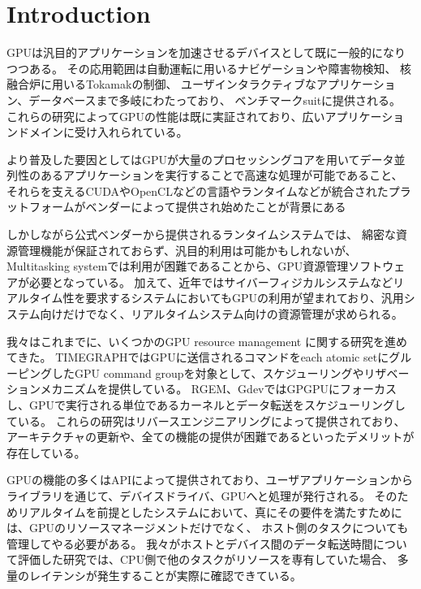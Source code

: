 \section{Introduction}
GPUは汎目的アプリケーションを加速させるデバイスとして既に一般的になりつつある。
その応用範囲は自動運転に用いるナビゲーション\cite{cmu:routing}や障害物検知\cite{hirabayashi:cpsna2013}、
核融合炉に用いるTokamakの制御\cite{tokamak}、
ユーザインタラクティブなアプリケーション\cite{kato:rtas2011}、データベース\cite{bakkum:sql}まで多岐にわたっており、
ベンチマークsuit\cite{rodinia}に提供される。
これらの研究によってGPUの性能は既に実証されており、広いアプリケーションドメインに受け入れられている。

より普及した要因としてはGPUが大量のプロセッシングコアを用いてデータ並列性のあるアプリケーションを実行することで高速な処理が可能であること、
それらを支えるCUDA\cite{nvidia:cuda_zone}やOpenCL\cite{opencl}などの言語やランタイムなどが統合されたプラットフォームがベンダーによって提供され始めたことが背景にある

しかしながら公式ベンダーから提供されるランタイムシステムでは、
綿密な資源管理機能が保証されておらず、汎目的利用は可能かもしれないが、Multitasking systemでは利用が困難であることから、GPU資源管理ソフトウェアが必要となっている。
加えて、近年ではサイバーフィジカルシステムなどリアルタイム性を要求するシステムにおいてもGPUの利用が望まれており、汎用システム向けだけでなく、リアルタイムシステム向けの資源管理が求められる。

我々はこれまでに、いくつかのGPU resource management に関する研究を進めてきた。
TIMEGRAPH\cite{kato:timegraph}ではGPUに送信されるコマンドをeach atomic setにグルーピングしたGPU command groupを対象として、スケジューリングやリザベーションメカニズムを提供している。
RGEM\cite{kato:rgem}、Gdev\cite{kato:gdev}ではGPGPUにフォーカスし、GPUで実行される単位であるカーネルとデータ転送をスケジューリングしている。
これらの研究はリバースエンジニアリングによって提供されており、アーキテクチャの更新や、全ての機能の提供が困難であるといったデメリットが存在している。

GPUの機能の多くはAPIによって提供されており、ユーザアプリケーションからライブラリを通じて、デバイスドライバ、GPUへと処理が発行される。
そのためリアルタイムを前提としたシステムにおいて、真にその要件を満たすためには、GPUのリソースマネージメントだけでなく、
ホスト側のタスクについても管理してやる必要がある。
我々がホストとデバイス間のデータ転送時間について\cite{fujii:icpads2013}評価した研究では、CPU側で他のタスクがリソースを専有していた場合、
多量のレイテンシが発生することが実際に確認できている。

